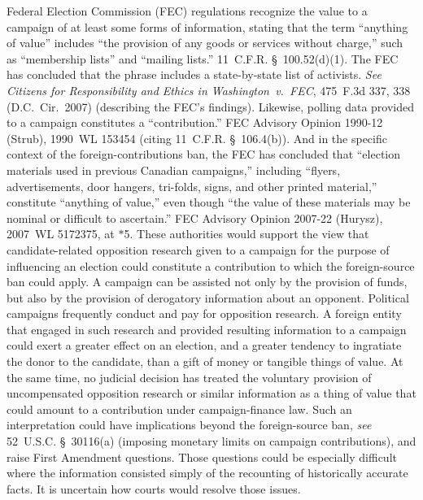 Federal Election Commission (FEC) regulations recognize the value to a campaign of at least some forms of information, stating that the term ``anything of value'' includes ``the provision of any goods or services without charge,'' such as ``membership lists'' and ``mailing lists.''
11~C.F.R. \S~100.52(d)(1).
The FEC has concluded that the phrase includes a state-by-state list of activists.
\textit{See Citizens for Responsibility and Ethics in Washington~v.\ FEC}, 475~F.3d 337, 338 (D.C.~Cir.~2007) (describing the FEC's findings).
Likewise, polling data provided to a campaign constitutes a ``contribution.''
FEC Advisory Opinion 1990-12 (Strub), 1990~WL 153454 (citing 11~C.F.R. \S~106.4(b)).
And in the specific context of the foreign-contributions ban, the FEC has concluded that ``election materials used in previous Canadian campaigns,'' including ``flyers, advertisements, door hangers, tri-folds, signs, and other printed material,'' constitute ``anything of value,'' even though ``the value of these materials may be nominal or difficult to ascertain.''
FEC Advisory Opinion 2007-22 (Hurysz), 2007~WL 5172375, at $\ast$5.
These authorities would support the view that candidate-related opposition research given to a campaign for the purpose of influencing an election could constitute a contribution to which the foreign-source ban could apply.
A campaign can be assisted not only by the provision of funds, but also by the provision of derogatory information about an opponent.
Political campaigns frequently conduct and pay for opposition research.
A foreign entity that engaged in such research and provided resulting information to a campaign could exert a greater effect on an election, and a greater tendency to ingratiate the donor to the candidate, than a gift of money or tangible things of value.
At the same time, no judicial decision has treated the voluntary provision of uncompensated opposition research or similar information as a thing of value that could amount to a contribution under campaign-finance law.
Such an interpretation could have implications beyond the foreign-source ban, \textit{see} 52~U.S.C. \S~30116(a) (imposing monetary limits on campaign contributions), and raise First Amendment questions.
Those questions could be especially difficult where the information consisted simply of the recounting of historically accurate facts.
It is uncertain how courts would resolve those issues.

